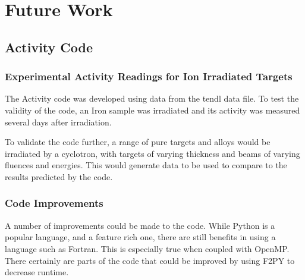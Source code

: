 \chapter{Future Work}
\label{chapter:futurework}

\begin{changemargin}{1.0cm}{1.0cm} 
\end{changemargin}


\section{Activity Code}

\subsection{Experimental Activity Readings for Ion Irradiated Targets}

The Activity code was developed using data from the \acrshort{tendl} data file.  To test the validity of the code, an Iron sample was irradiated and its activity was measured several days after irradiation.

To validate the code further, a range of pure targets and alloys would be irradiated by a cyclotron, with targets of varying thickness and beams of varying fluences and energies.  This would generate data to be used to compare to the results predicted by the code.  


\subsection{Code Improvements}

A number of improvements could be made to the code.  While Python is a popular language, and a feature rich one, there are still benefits in using a language such as Fortran.  This is especially true when coupled with OpenMP.  There certainly are parts of the code that could be improved by using F2PY to decrease runtime.

